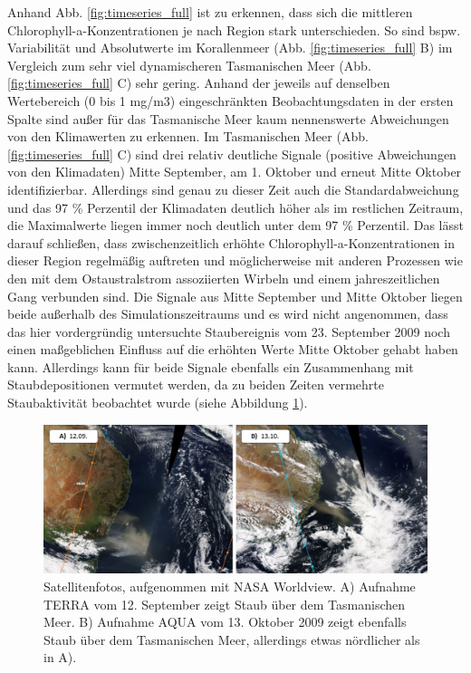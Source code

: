 \documentclass[12pt,a4paper,onecolumn]{scrartcl}
\begin{document}
Anhand Abb. \ref{fig:timeseries_full} ist zu erkennen, dass sich die mittleren Chlorophyll-a-Konzentrationen je nach Region stark unterschieden. So sind bspw. Variabilität und Absolutwerte im Korallenmeer (Abb. \ref{fig:timeseries_full} B) im Vergleich zum sehr viel dynamischeren Tasmanischen Meer (Abb. \ref{fig:timeseries_full} C) sehr gering. Anhand der jeweils auf denselben Wertebereich (0 bis 1 mg/m3) eingeschränkten Beobachtungsdaten in der ersten Spalte sind außer für das Tasmanische Meer kaum nennenswerte Abweichungen von den Klimawerten zu erkennen. Im Tasmanischen Meer (Abb. \ref{fig:timeseries_full} C) sind drei relativ deutliche Signale (positive Abweichungen von den Klimadaten) Mitte September, am 1. Oktober und erneut Mitte Oktober identifizierbar. Allerdings sind genau zu dieser Zeit auch die Standardabweichung und das 97 \% Perzentil der Klimadaten deutlich höher als im restlichen Zeitraum, die Maximalwerte liegen immer noch deutlich unter dem 97 \% Perzentil. Das lässt darauf schließen, dass zwischenzeitlich erhöhte Chlorophyll-a-Konzentrationen in dieser Region regelmäßig auftreten und möglicherweise mit anderen Prozessen wie den mit dem Ostaustralstrom assoziierten Wirbeln und einem jahreszeitlichen Gang \citep{Tilburg.2002} verbunden sind. Die Signale aus Mitte September und Mitte Oktober liegen beide außerhalb des Simulationszeitraums und es wird nicht angenommen, dass das hier vordergründig untersuchte Staubereignis vom 23. September 2009 noch einen maßgeblichen Einfluss auf die erhöhten Werte Mitte Oktober gehabt haben kann. Allerdings kann für beide Signale ebenfalls ein Zusammenhang mit Staubdepositionen vermutet werden, da zu beiden Zeiten vermehrte Staubaktivität beobachtet wurde (siehe Abbildung \ref{fig:duststorms_surrounding}). 
\begin{figure}
\includegraphics[width=\textwidth]{bilder/duststorms_surround.png}
\caption{Satellitenfotos, aufgenommen mit NASA Worldview. A) Aufnahme TERRA vom 12. September zeigt Staub über dem Tasmanischen Meer. B) Aufnahme AQUA vom 13. Oktober 2009 zeigt ebenfalls Staub über dem Tasmanischen Meer, allerdings etwas nördlicher als in A). } \label{fig:duststorms_surrounding}
\end{figure}
\end{document}
